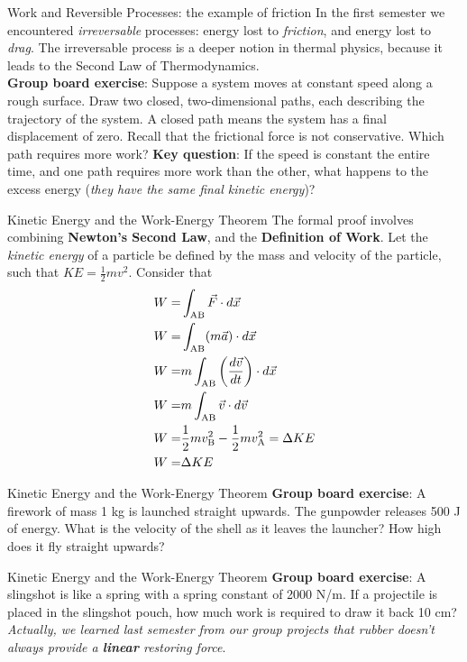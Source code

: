 \documentclass{beamer}
\begin{document}
\begin{frame}{Work and Reversible Processes: the example of friction}
\small
In the first semester we encountered \textit{irreversable} processes: energy lost to \textit{friction}, and energy lost to \textit{drag}. \alert{The irreversable process is a deeper notion in thermal physics}, because it leads to the Second Law of Thermodynamics. \\ \vspace{0.5cm}
\textbf{Group board exercise}: Suppose a system moves at constant speed along a rough surface.  Draw two closed, two-dimensional paths, each describing the trajectory of the system.  A closed path means the system has a final displacement of zero.  Recall that the frictional force is not conservative.  Which path requires more work?  \textbf{Key question}: If the speed is constant the entire time, and one path requires more work than the other, what happens to the excess energy (\textit{they have the same final kinetic energy})?
\end{frame}

\begin{frame}{Kinetic Energy and the Work-Energy Theorem}
\small
The formal proof involves combining \textbf{Newton's Second Law}, and the \textbf{Definition of Work}.  Let the \textit{kinetic energy} of a particle be defined by the mass and velocity of the particle, such that $KE = \frac{1}{2}mv^2$.  Consider that
\begin{align}
W =& \int_{\rm AB} \vec{F} \cdot d\vec{x} \\
W =& \int_{\rm AB} (m\vec{a}) \cdot d\vec{x} \\
W =& m\int_{\rm AB} \left( \frac{d\vec{v}}{dt} \right) \cdot d\vec{x} \\
W =& m\int_{\rm AB} \vec{v} \cdot d\vec{v} \\
W =& \frac{1}{2}m v_{\rm B}^2 - \frac{1}{2}m v_{\rm A}^2 = \Delta KE \\
W =& \Delta KE
\end{align}
\end{frame}

\begin{frame}{Kinetic Energy and the Work-Energy Theorem}
\textbf{Group board exercise}: A firework of mass 1 kg is launched straight upwards.  The gunpowder releases 500 J of energy.  What is the velocity of the shell as it leaves the launcher?  How high does it fly straight upwards?
\end{frame}

\begin{frame}{Kinetic Energy and the Work-Energy Theorem}
\textbf{Group board exercise}: A slingshot is like a spring with a spring constant of 2000 N/m.  If a projectile is placed in the slingshot pouch, how much work is required to draw it back 10 cm? \\ \vspace{0.5cm}
\small
\textit{Actually, we learned last semester from our group projects that rubber doesn't always provide a \textbf{linear} restoring force}.
\end{frame}
\end{document}
